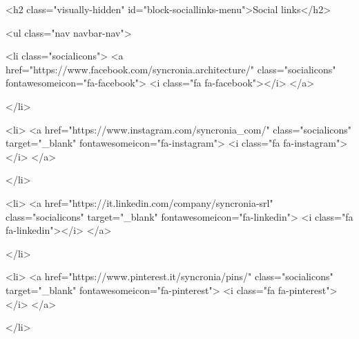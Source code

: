   <h2 class="visually-hidden" id="block-sociallinks-menu">Social links</h2>
  

        
              <ul class="nav navbar-nav">
            
                   
            
                      
            
    

                    <li class="socialicons">
                  <a href="https://www.facebook.com/syncronia.architecture/" class="socialicons" fontawesomeicon="fa-facebook">            <i class="fa fa-facebook"></i>
          </a>
                    
            </li>
        
                   
            
                      
            
    

                    <li>
                  <a href="https://www.instagram.com/syncronia_com/" class="socialicons" target="_blank" fontawesomeicon="fa-instagram">            <i class="fa fa-instagram"></i>
          </a>
                    
            </li>
        
                   
            
                      
            
    

                    <li>
                  <a href="https://it.linkedin.com/company/syncronia-srl" class="socialicons" target="_blank" fontawesomeicon="fa-linkedin">            <i class="fa fa-linkedin"></i>
          </a>
                    
            </li>
        
                   
            
                      
            
    

                    <li>
                  <a href="https://www.pinterest.it/syncronia/pins/" class="socialicons" target="_blank" fontawesomeicon="fa-pinterest">            <i class="fa fa-pinterest"></i>
          </a>
                    
            </li>
        
                   
            
                      
            
    

